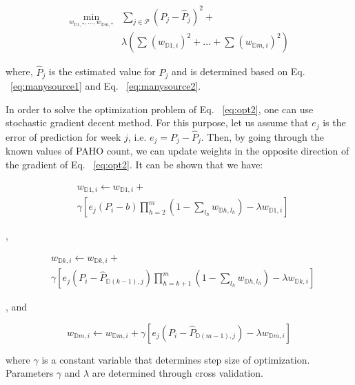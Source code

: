 \begin{equation}
\begin{array}{ll}
\min_{w_{\mathbb{D}1,*}, ... ,w_{\mathbb{D}m,*}} & \sum_{j \in \mathcal{P}} {(P_j - \hat{P}_j)^2} +
\\ 
& \lambda (\sum_{}{}{{(w_{\mathbb{D}1,i})}^2}+...+\sum_{}{}{{(w_{\mathbb{D}m,i})}^2})
\end{array}
\label{eq:opt2}
\end{equation}

where, $\hat{P}_j$ is the estimated value for $P_j$ and is determined based on Eq. ~\ref{eq:manysource1} and Eq. ~\ref{eq:manysource2}.

In order to solve the optimization problem of Eq. ~\ref{eq:opt2}, one can use stochastic gradient decent method. For this purpose, let us assume that $e_j$ is the error of prediction for week $j$, i.e. $e_j = P_j - \hat{P}_j$. Then, by going through the known values of PAHO count, we can update weights in the opposite direction of the gradient of Eq. ~\ref{eq:opt2}. It can be shown that we have:

\begin{equation}
\begin{array}{ll}
& w_{\mathbb{D}1,i} \leftarrow w_{\mathbb{D}1,i}+ \\
& \gamma \left [e_j(P_i - b)\prod_{h=2}^{m} (1- \sum_{l_h}w_{\mathbb{D}h,l_h})   - \lambda w_{\mathbb{D}1,i}  \right ]
\end{array}
\end{equation}

, 

\begin{equation}
\begin{array}{ll}
& w_{\mathbb{D}k,i}  \leftarrow w_{\mathbb{D}k,i}+ \\
& \gamma \left [e_j(P_i - \hat{P}_{\mathbb{D}(k-1),j})\prod_{h=k+1}^{m} (1- \sum_{l_h}w_{\mathbb{D}h,l_h})   - \lambda w_{\mathbb{D}k,i}  \right ]
\end{array}
\end{equation}

, and

\begin{equation}
w_{\mathbb{D}m,i} \leftarrow w_{\mathbb{D}m,i}+ \gamma \left [e_j(P_i - \hat{P}_{\mathbb{D}(m-1),j}) - \lambda w_{\mathbb{D}m,i}  \right ]
\end{equation}

where $\gamma$ is a constant variable that determines step size of optimization. Parameters $\gamma$ and $\lambda$ are determined through cross validation.

